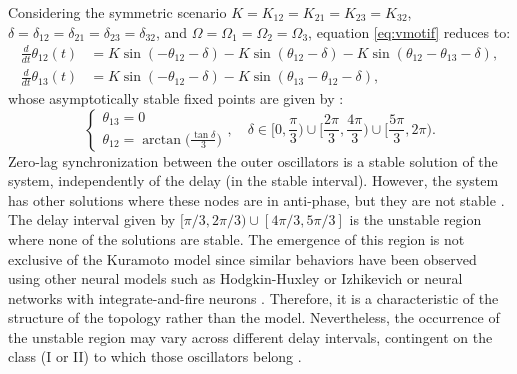 \documentclass[../main.tex]{subfiles}
\begin{document}
Considering the symmetric scenario $K = K_{12} = K_{21} = K_{23} = K_{32}$, $\delta = \delta_{12} = \delta_{21} = \delta_{23} = \delta_{32}$, and $\Omega = \Omega_1 = \Omega_2 = \Omega_3$, equation \eqref{eq:vmotif} reduces to:
\begin{equation}
    \begin{aligned}
    \displaystyle\frac{d}{dt}\theta_{12}(t) &= K\sin(-\theta_{12}-\delta) - K\sin(\theta_{12}-\delta)- K\sin(\theta_{12}-\theta_{13}-\delta), \\
    \displaystyle\frac{d}{dt}\theta_{13}(t) &= K\sin(-\theta_{12}-\delta)-
    K\sin(\theta_{13}-\theta_{12}-\delta),
    \end{aligned}
    \label{eq:vmotif-symmetric}
\end{equation}
whose asymptotically stable fixed points are given by \citep{mirasso_anticipated_2017}: 
\begin{equation}
    \begin{cases}
        \theta_{13} = 0\\
        \theta_{12} = \arctan\bigg(\displaystyle\frac{\tan\delta}{3}\bigg) 
    \end{cases},
        \quad \delta\in\bigg[0,\displaystyle\frac{\pi}{3}\bigg)\cup\bigg[\displaystyle\frac{2\pi}{3},\displaystyle\frac{4\pi}{3}\bigg)\cup
        \bigg[\displaystyle\frac{5\pi}{3},2\pi\bigg).
\end{equation}
Zero-lag synchronization between the outer oscillators is a stable solution of the system, independently of the delay (in the stable interval).
However, the system has other solutions where these nodes are in anti-phase, but they are not stable \citep{mirasso_anticipated_2017}.
The delay interval given by $[\pi/3,2\pi/3)\cup[4\pi/3,5\pi/3]$ is the unstable region where none of the solutions are stable.
The emergence of this region is not exclusive of the Kuramoto model since similar behaviors have been observed using other neural models such as Hodgkin-Huxley or Izhikevich \citep{mirasso_anticipated_2017} or neural networks with integrate-and-fire neurons \citep{gollo_dynamic_2010}.
Therefore, it is a characteristic of the structure of the topology rather than the model.
Nevertheless, the occurrence of the unstable region may vary across different delay intervals, contingent on the class (I or II) to which those oscillators belong \citep{sadeghi_synchronization_2014}.
\end{document}
